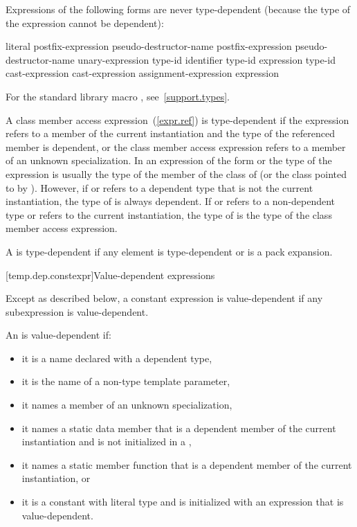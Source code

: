 \pnum
Expressions of the following forms are never type-dependent (because the type
of the expression cannot be dependent):

\begin{ncbnftab}
literal\br
postfix-expression  pseudo-destructor-name\br
postfix-expression \terminal{->} pseudo-destructor-name\br
{} unary-expression\br
{} type-id \terminal{)}\br
{}  \terminal{(} identifier \terminal{)}\br
{} type-id \terminal{)}\br
{} expression \terminal{)}\br
{} type-id \terminal{)}\br
{} cast-expression\br
{} cast-expression\br
{} assignment-expression\opt\br
{} \terminal{(} expression \terminal{)}
\end{ncbnftab}

\enternote For the standard library macro ,
see~\ref{support.types}.\exitnote

\pnum
A class member access expression~(\ref{expr.ref}) is
type-dependent if
the expression refers to a member of the current instantiation and
the type of the referenced member is dependent, or the class member access
expression refers to a member of an unknown specialization.
\enternote
In an expression of the form
or
the type of the expression is usually the type of the member
of the class of
(or the class pointed to by
).
However, if
or
refers to a dependent type that is not the current instantiation,
the type of
is always dependent. If
or 
refers to a non-dependent type or refers to the current instantiation, the
type of
is the type of the class member access expression.
\exitnote

\pnum
A  is type-dependent if any element is
type-dependent or is a pack expansion.

[temp.dep.constexpr]{Value-dependent expressions}

\pnum
Except as described below, a constant expression is value-dependent if any
subexpression is value-dependent.

\pnum
An
is value-dependent if:

\begin{itemize}
\item
it is a name declared with a dependent type,
\item
it is the name of a non-type template parameter,
\item
it names a member of an unknown specialization,
\item
it names a static data member that is a dependent member of the current
instantiation and is not initialized in a ,
\item
it names a static member function that is a dependent member of the current
instantiation, or
\item
it is a constant with literal type and is initialized with an
expression that is value-dependent.
\end{itemize}

